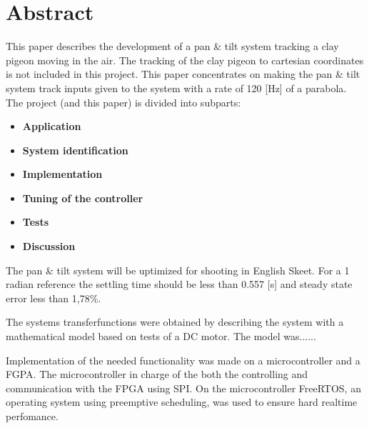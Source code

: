 
\setcounter{page}{1}
\section*{Abstract}

This paper describes the development of a pan \& tilt system tracking a clay 
pigeon moving in the air. 
The tracking of the clay pigeon to cartesian coordinates is not included in this 
project. This paper concentrates on making the pan \& tilt system track inputs 
given to the system with a rate of 120 [Hz] of a parabola.
The project (and this paper) is divided into subparts: 
 
\begin{itemize}
  \item \textbf{Application}
  \item \textbf{System identification} 
  \item \textbf{Implementation}
  \item \textbf{Tuning of the controller} 
  \item \textbf{Tests} 
  \item \textbf{Discussion} 
\end{itemize}

The pan \& tilt system will be uptimized for shooting in English Skeet. For a 1 
radian reference the settling time should be less than 0.557 [s] and steady 
state error less than 1,78\%.

The systems transferfunctions were obtained by describing the system with a 
mathematical model based on tests of a DC motor. The model was......

Implementation of the needed functionality was made on a microcontroller and a 
FGPA. The microcontroller in charge of the both the controlling and 
communication with the FPGA using SPI. 
On the microcontroller FreeRTOS, an operating system using preemptive scheduling, was used 
to ensure hard realtime perfomance.
